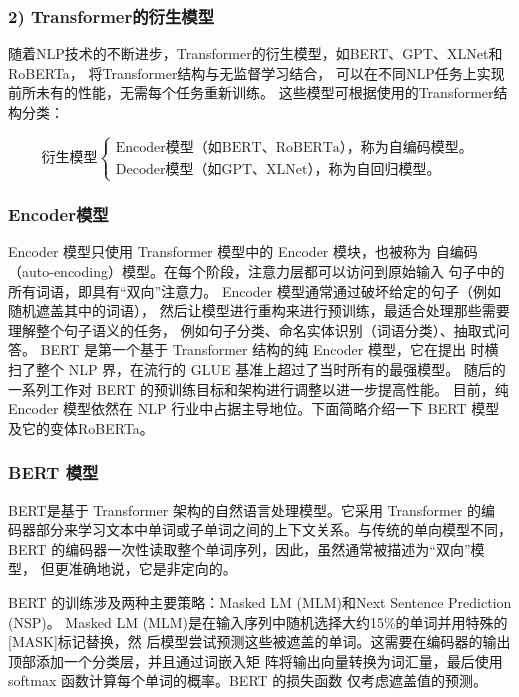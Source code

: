 \subsubsection*{2) Transformer的衍生模型}

随着NLP技术的不断进步，Transformer的衍生模型，如BERT、GPT、XLNet和RoBERTa，
将Transformer结构与无监督学习结合，
可以在不同NLP任务上实现前所未有的性能，无需每个任务重新训练。
这些模型可根据使用的Transformer结构分类：

\begin{equation*}
  \text{衍生模型} \left\{
      \begin{array}{l}
        \text{Encoder模型（如BERT、RoBERTa），称为自编码模型。} \\ 
        \text{Decoder模型（如GPT、XLNet），称为自回归模型。}
      \end{array}
  \right.
\end{equation*}




\subsubsection*{Encoder模型}

Encoder 模型只使用 Transformer 模型中的 Encoder 模块，也被称为
自编码（auto-encoding）模型。在每个阶段，注意力层都可以访问到原始输入
句子中的所有词语，即具有``双向''注意力。
Encoder 模型通常通过破坏给定的句子（例如随机遮盖其中的词语），
然后让模型进行重构来进行预训练，最适合处理那些需要理解整个句子语义的任务，
例如句子分类、命名实体识别（词语分类）、抽取式问答。
BERT 是第一个基于 Transformer 结构的纯 Encoder 模型，它在提出
时横扫了整个 NLP 界，在流行的 GLUE 基准上超过了当时所有的最强模型。
随后的一系列工作对 BERT 的预训练目标和架构进行调整以进一步提高性能。
目前，纯 Encoder 模型依然在 NLP 行业中占据主导地位。下面简略介绍一下 
BERT 模型及它的变体RoBERTa。

\subsubsection*{BERT 模型}

BERT是基于 Transformer 架构的自然语言处理模型。它采用 Transformer 的编
码器部分来学习文本中单词或子单词之间的上下文关系。与传统的单向模型不同，
BERT 的编码器一次性读取整个单词序列，因此，虽然通常被描述为``双向''模型，
但更准确地说，它是非定向的。

BERT 的训练涉及两种主要策略：Masked LM (MLM)和Next Sentence Prediction (NSP)。
Masked LM (MLM)是在输入序列中随机选择大约15\%的单词并用特殊的[MASK]标记替换，然
后模型尝试预测这些被遮盖的单词。这需要在编码器的输出顶部添加一个分类层，并且通过词嵌入矩
阵将输出向量转换为词汇量，最后使用 softmax 函数计算每个单词的概率。BERT 的损失函数
仅考虑遮盖值的预测。

